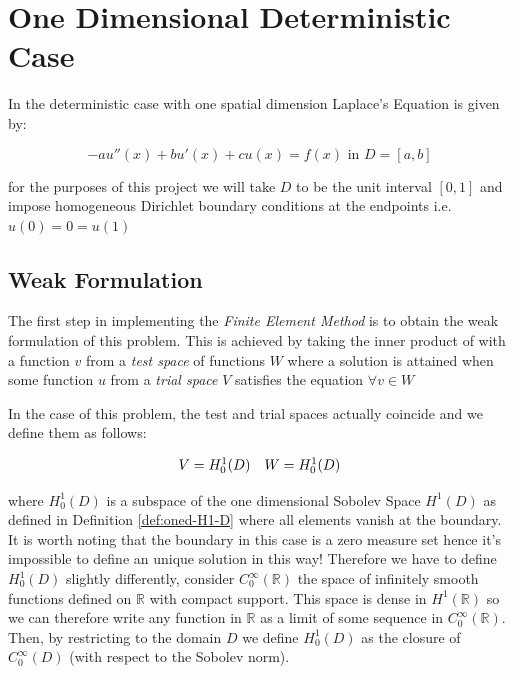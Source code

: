 \chapter{One Dimensional Deterministic Case}\label{chap:oned-deterministic}

In the deterministic case with one spatial dimension Laplace's Equation is
given by:

\begin{equation}\label{eq:oned-deterministic}
    -au''(x) + bu'(x) + cu(x) = f(x) \text{ in } D = [a, b]
\end{equation}

for the purposes of this project we will take $D$ to be the unit interval
$[0,1]$ and impose homogeneous Dirichlet boundary conditions at the endpoints
i.e. $u(0) = 0 = u(1)$

\section{Weak Formulation}

The first step in implementing the \textit{Finite Element Method} is to obtain
the weak formulation of this problem. This is achieved by taking the inner
product of  with a function $v$ from a
\textit{test space} of functions $W$ where a solution is attained when some
function $u$ from a \textit{trial space} $V$ satisfies the equation $\forall
v\in W$

In the case of this problem, the test and trial spaces actually coincide and we
define them as follows:

\begin{equation}
    \begin{array}{c c}
        V = H^1_0(D) & W = H^1_0(D)
    \end{array}
\end{equation}

where $H^1_0(D)$ is a subspace of the one dimensional Sobolev Space $H^1(D)$ as
defined in Definition \ref{def:oned-H1-D} where all elements vanish at the
boundary. It is worth noting that the boundary in this case is a zero measure
set hence it's impossible to define an unique solution in this way! Therefore
we have to define $H^1_0(D)$ slightly differently, consider
$C^\infty_0(\mathbb{R})$ the space of infinitely smooth functions defined on
$\mathbb{R}$ with compact support. This space is dense in $H^1(\mathbb{R})$ so
we can therefore write any function in $\mathbb{R}$ as a limit of some sequence
in $C_0^\infty(\mathbb{R})$. Then, by restricting to the domain $D$ we define
$H^1_0(D)$ as the closure of $C_0^\infty(D)$ (with respect to the Sobolev
norm).

